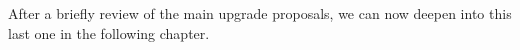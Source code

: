 After a briefly review of the main upgrade proposals, we can now deepen into this last one in the following chapter.



\begin{comment}
SuperKEKB is already the world's highest-luminosity collider and it aims to reach a new peaks luminosity [of 6.3 $\dot 10^{35}$ $cm^{-2}s^{-1}$] in the future by further increasing the beam-currents and reducing the beam-size at the interaction point by squeezing the betatron function down to $\beta^{*}_{y}$ = 0.3 mm (mentioned in section REFERENCE). For this reason, it's necessary to understand how to mitigate the beam backgrounds where possible and how to cope with the consequent challenges. 
\end{comment}


\begin{comment}
[So it is a of a great importance simulate and measure the background to check on the state of the detector and the machine but also to predict how the conditions could change.]
In figure .... the Belle II background level measured in..... is shown. Current background rates in the experiment are acceptable and above all in most cases well below the limits (listed??). 
\end{comment}
